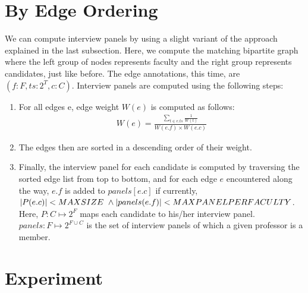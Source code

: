 \documentclass[12pt,a4paper]{article}
\begin{document}
\section{By Edge Ordering}
We can compute interview panels by using a slight variant of the approach explained in the last subsection. Here, we compute the matching bipartite graph where the left group of nodes represents faculty and the right group represents candidates, just like before. The edge annotations, this time, are $(f : F, ts : 2^T, c : C)$. Interview panels are computed using the following steps:

\begin{enumerate}
\item For all edges e, edge weight $W(e)$ is computed as follows:
\begin{eqnarray}
W(e) = \frac{\sum\limits_{t \in e.ts}{\frac{1}{W(t)}}}{W(e.f) \times W(e.c)}
\end{eqnarray}
\item The edges then are sorted in a descending order of their weight.
\item Finally, the interview panel for each candidate is computed by traversing the sorted edge list from top to bottom, and for each edge $e$ encountered along the way, $e.f$ is added to $panels[e.c]$ if currently, \\
$|P(e.c)| < MAXSIZE\ \land \\ |panels(e.f)| < MAXPANELPERFACULTY$. Here, $P : C \mapsto 2^F$ maps each candidate to his/her interview panel. $panels: F \mapsto 2 ^{F \cup C}$ is the set of interview panels of which a given professor is a member.

\end{enumerate}

\section{Experiment}
\end{document}
